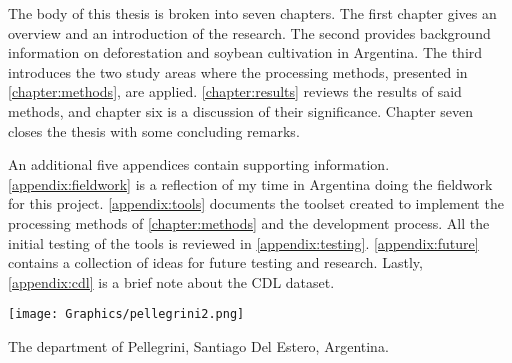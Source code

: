 The body of this thesis is broken into seven chapters. The first chapter gives an overview and an introduction of the research. The second provides background information on deforestation and soybean cultivation in Argentina. The third introduces the two study areas where the processing methods, presented in \autoref{chapter:methods}, are applied. \autoref{chapter:results} reviews the results of said methods, and chapter six is a discussion of their significance. Chapter seven closes the thesis with some concluding remarks.

An additional five appendices contain supporting information. \autoref{appendix:fieldwork} is a reflection of my time in Argentina doing the fieldwork for this project. \autoref{appendix:tools} documents the toolset created to implement the processing methods of \autoref{chapter:methods} and the development process. All the initial testing of the tools is reviewed in \autoref{appendix:testing}. \autoref{appendix:future} contains a collection of ideas for future testing and research. Lastly, \autoref{appendix:cdl} is a brief note about the CDL dataset.

\begin{ssfigure}
  \centering
  \texttt{[image: Graphics/pellegrini2.png]}
  \caption{The department of Pellegrini, Santiago Del Estero, Argentina.}
  \label{fig:pellegrini}
\end{ssfigure}
